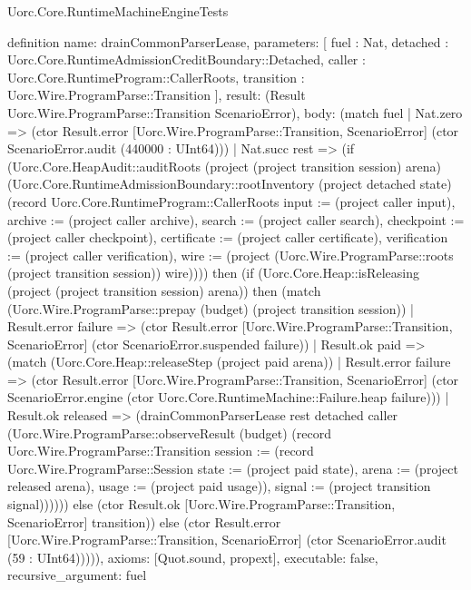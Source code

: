 \begin{lexlean}{Uorc.Core.RuntimeMachineEngineTests}
\begin{semanticmodule}
definition{
  name: drainCommonParserLease,
  parameters: [
    fuel : Nat,
    detached : Uorc.Core.RuntimeAdmissionCreditBoundary::Detached,
    caller : Uorc.Core.RuntimeProgram::CallerRoots,
    transition : Uorc.Wire.ProgramParse::Transition
  ],
  result: (Result Uorc.Wire.ProgramParse::Transition ScenarioError),
  body: (match fuel
    | Nat.zero => (ctor Result.error [Uorc.Wire.ProgramParse::Transition, ScenarioError] (ctor ScenarioError.audit (440000 : UInt64)))
    | Nat.succ rest => (if (Uorc.Core.HeapAudit::auditRoots (project (project transition session) arena) (Uorc.Core.RuntimeAdmissionBoundary::rootInventory (project detached state) (record Uorc.Core.RuntimeProgram::CallerRoots {input := (project caller input), archive := (project caller archive), search := (project caller search), checkpoint := (project caller checkpoint), certificate := (project caller certificate), verification := (project caller verification), wire := (project (Uorc.Wire.ProgramParse::roots (project transition session)) wire)}))) then (if (Uorc.Core.Heap::isReleasing (project (project transition session) arena)) then (match (Uorc.Wire.ProgramParse::prepay (budget) (project transition session))
      | Result.error failure => (ctor Result.error [Uorc.Wire.ProgramParse::Transition, ScenarioError] (ctor ScenarioError.suspended failure))
      | Result.ok paid => (match (Uorc.Core.Heap::releaseStep (project paid arena))
        | Result.error failure => (ctor Result.error [Uorc.Wire.ProgramParse::Transition, ScenarioError] (ctor ScenarioError.engine (ctor Uorc.Core.RuntimeMachine::Failure.heap failure)))
        | Result.ok released => (drainCommonParserLease rest detached caller (Uorc.Wire.ProgramParse::observeResult (budget) (record Uorc.Wire.ProgramParse::Transition {session := (record Uorc.Wire.ProgramParse::Session {state := (project paid state), arena := (project released arena), usage := (project paid usage)}), signal := (project transition signal)}))))) else (ctor Result.ok [Uorc.Wire.ProgramParse::Transition, ScenarioError] transition)) else (ctor Result.error [Uorc.Wire.ProgramParse::Transition, ScenarioError] (ctor ScenarioError.audit (59 : UInt64))))),
  axioms: [Quot.sound, propext],
  executable: false,
  recursive_argument: fuel
}


\end{semanticmodule}
\end{lexlean}
